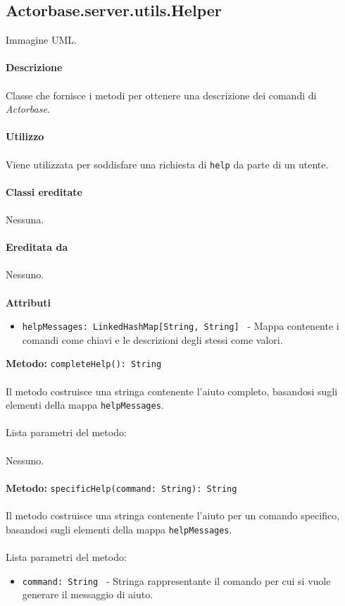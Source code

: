 \documentclass[a4paper]{article}
\begin{document}
	\subsection{Actorbase.server.utils.Helper}
		Immagine UML.
		\\ \\
		\textbf{Descrizione}
			\\ \\
			Classe che fornisce i metodi per ottenere una descrizione dei comandi di \emph{Actorbase}.
			\\ \\
		\textbf{Utilizzo}
			\\ \\
			Viene utilizzata per soddisfare una richiesta di \texttt{help} da parte di un utente.
			\\ \\
		\textbf{Classi ereditate}
			\\ \\
			Nessuna.
			\\ \\
		\textbf{Ereditata da}
			\\ \\
			Nessuno.
			\\ \\
		\textbf{Attributi}
			\begin{itemize}
				\item \texttt{helpMessages: LinkedHashMap[String, String] } - Mappa contenente i comandi come chiavi e le descrizioni degli stessi come valori.
			\end{itemize}
		\textbf{Metodo: }\texttt{completeHelp(): String}
			\\ \\
			Il metodo costruisce una stringa contenente l'aiuto completo, basandosi sugli elementi della mappa \texttt{helpMessages}.
			\\ \\
			Lista parametri del metodo:
			\\ \\
			Nessuno.
			\\ \\
		\textbf{Metodo: }\texttt{specificHelp(command: String): String}
			\\ \\
			Il metodo costruisce una stringa contenente l'aiuto per un comando specifico, basandosi sugli elementi della mappa \texttt{helpMessages}.
			\\ \\
			Lista parametri del metodo:
			\begin{itemize}
				\item \texttt{command: String } - Stringa rappresentante il comando per cui si vuole generare il messaggio di aiuto.
			\end{itemize}
			
\end{document}
